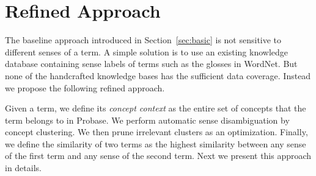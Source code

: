 \section{Refined Approach}
\label{sec:refine}
The baseline approach introduced in Section~\ref{sec:basic} is not
sensitive to different senses of a term.
%
%
A simple solution is to use an
existing knowledge database containing sense labels of terms such as
the glosses in WordNet. But none of the handcrafted knowledge bases
has the sufficient data coverage. Instead we propose the following
refined approach.


Given a term, we define its {\it concept context} as the entire set of concepts that the term belongs to in Probase. We perform automatic
sense disambiguation by concept clustering.
We then prune irrelevant clusters as an optimization.
Finally, we define the similarity of two terms as the
highest similarity between any sense of the
first term and any sense of the second term. Next we present this approach
in details.
%






